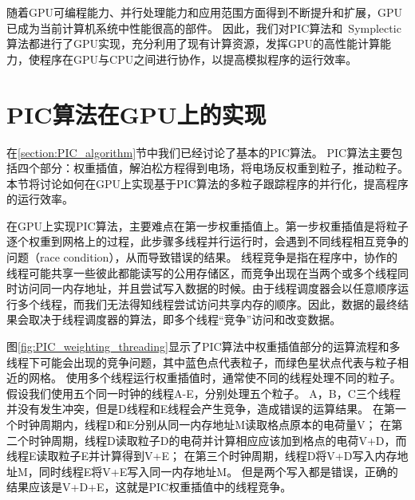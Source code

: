 随着GPU可编程能力、并行处理能力和应用范围方面得到不断提升和扩展，GPU已成为当前计算机系统中性能很高的部件。
因此，我们对PIC算法和~Symplectic算法都进行了GPU实现，充分利用了现有计算资源，发挥GPU的高性能计算能力，使程序在GPU与CPU之间进行协作，以提高模拟程序的运行效率。

\section{PIC算法在GPU上的实现}
在\ref{section:PIC_algorithm}节中我们已经讨论了基本的PIC算法。
PIC算法主要包括四个部分：权重插值，解泊松方程得到电场，将电场反权重到粒子，推动粒子。
本节将讨论如何在GPU上实现基于PIC算法的多粒子跟踪程序的并行化，提高程序的运行效率。

在GPU上实现PIC算法，主要难点在第一步权重插值上。第一步权重插值是将粒子逐个权重到网格上的过程，此步骤多线程并行运行时，会遇到不同线程相互竞争的问题（race condition），从而导致错误的结果。
线程竞争是指在程序中，协作的线程可能共享一些彼此都能读写的公用存储区，而竞争出现在当两个或多个线程同时访问同一内存地址，并且尝试写入数据的时候。由于线程调度器会以任意顺序运行多个线程，而我们无法得知线程尝试访问共享内存的顺序。因此，数据的最终结果会取决于线程调度器的算法，即多个线程“竞争”访问和改变数据。

图\ref{fig:PIC_weighting_threading}显示了PIC算法中权重插值部分的运算流程和多线程下可能会出现的竞争问题，其中蓝色点代表粒子，而绿色星状点代表与粒子相近的网格。
使用多个线程运行权重插值时，通常使不同的线程处理不同的粒子。假设我们使用五个同一时钟的线程A-E，分别处理五个粒子。
A，B，C三个线程并没有发生冲突，但是D线程和E线程会产生竞争，造成错误的运算结果。
在第一个时钟周期内，线程D和E分别从同一内存地址M读取格点原本的电荷量V；
在第二个时钟周期，线程D读取粒子D的电荷并计算相应应该加到格点的电荷V+D，而线程E读取粒子E并计算得到V+E；
在第三个时钟周期，线程D将V+D写入内存地址M，同时线程E将V+E写入同一内存地址M。
但是两个写入都是错误，正确的结果应该是V+D+E，这就是PIC权重插值中的线程竞争。

